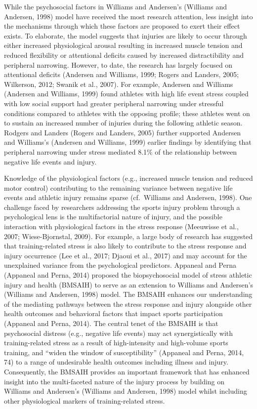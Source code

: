 \documentclass[
  english,
  man]{apa6}
\begin{document}
While the psychosocial factors in Williams and Andersen's (Williams and Andersen, 1998) model have received the most research attention, less insight into the mechanisms through which these factors are proposed to exert their effect exists. To elaborate, the model suggests that injuries are likely to occur through either increased physiological arousal resulting in increased muscle tension and reduced flexibility or attentional deficits caused by increased distractibility and peripheral narrowing. However, to date, the research has largely focused on attentional deficits (Andersen and Williams, 1999; Rogers and Landers, 2005; Wilkerson, 2012; Swanik et al., 2007). For example, Andersen and Williams (Andersen and Williams, 1999) found athletes with high life event stress coupled with low social support had greater peripheral narrowing under stressful conditions compared to athletes with the opposing profile; these athletes went on to sustain an increased number of injuries during the following athletic season. Rodgers and Landers (Rogers and Landers, 2005) further supported Andersen and Williams's (Andersen and Williams, 1999) earlier findings by identifying that peripheral narrowing under stress mediated 8.1\% of the relationship between negative life events and injury.

Knowledge of the physiological factors (e.g., increased muscle tension and reduced motor control) contributing to the remaining variance between negative life events and athletic injury remains sparse (cf.~Williams and Andersen, 1998). One challenge faced by researchers addressing the sports injury problem through a psychological lens is the multifactorial nature of injury, and the possible interaction with physiological factors in the stress response (Meeuwisse et al., 2007; Wiese-Bjornstal, 2009). For example, a large body of research has suggested that training-related stress is also likely to contribute to the stress response and injury occurrence (Lee et al., 2017; Djaoui et al., 2017) and may account for the unexplained variance from the psychological predictors. Appaneal and Perna (Appaneal and Perna, 2014) proposed the biopsychosocial model of stress athletic injury and health (BMSAIH) to serve as an extension to Williams and Andersen's (Williams and Andersen, 1998) model. The BMSAIH enhances our understanding of the mediating pathways between the stress response and injury alongside other health outcomes and behavioral factors that impact sports participation (Appaneal and Perna, 2014). The central tenet of the BMSAIH is that psychosocial distress (e.g., negative life events) may act synergistically with training-related stress as a result of high-intensity and high-volume sports training, and ``widen the window of susceptibility'' (Appaneal and Perna, 2014, 74) to a range of undesirable health outcomes including illness and injury. Consequently, the BMSAIH provides an important framework that has enhanced insight into the multi-faceted nature of the injury process by building on Williams and Andersen's (Williams and Andersen, 1998) model whilst including other physiological markers of training-related stress.
\end{document}
